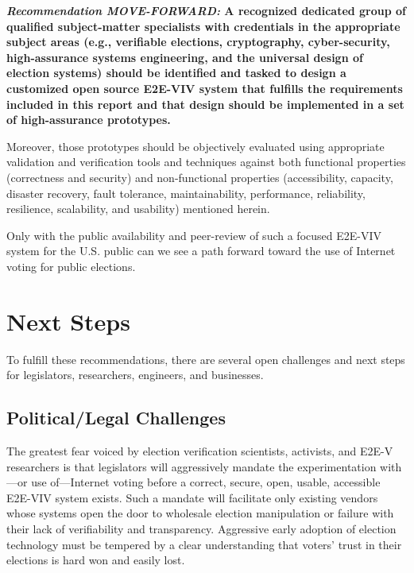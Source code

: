 \begin{center}
  \textbf{\emph{Recommendation MOVE-FORWARD:} A recognized dedicated
    group of qualified subject-matter specialists with credentials in
    the appropriate subject areas (e.g., verifiable elections,
    cryptography, cyber-security, high-assurance systems engineering,
    and the universal design of election systems) should be identified
    and tasked to design a customized open source E2E-VIV system that
    fulfills the requirements included in this report and that design
    should be implemented in a set of high-assurance prototypes.}
\end{center}

Moreover, those prototypes should be objectively evaluated using
appropriate validation and verification tools and techniques against
both functional properties (correctness and security) and
non-functional properties (accessibility, capacity, disaster recovery,
fault tolerance, maintainability, performance, reliability,
resilience, scalability, and usability) mentioned herein.

Only with the public availability and peer-review of such a focused
E2E-VIV system for the U.S. public can we see a path forward
toward the use of Internet voting for public elections.

\section{Next Steps}
\label{sec:next-steps}

To fulfill these recommendations, there are several open challenges
and next steps for legislators, researchers, engineers, and
businesses.

\subsection{Political/Legal Challenges}

The greatest fear voiced by election verification scientists,
activists, and E2E-V researchers is that legislators will aggressively
mandate the experimentation with---or use of---Internet voting before
a correct, secure, open, usable, accessible E2E-VIV system
exists. Such a mandate will facilitate only existing vendors whose
systems open the door to wholesale election manipulation or failure
with their lack of verifiability and transparency. Aggressive early
adoption of election technology must be tempered by a clear
understanding that voters' trust in their elections is hard won and
easily lost.

